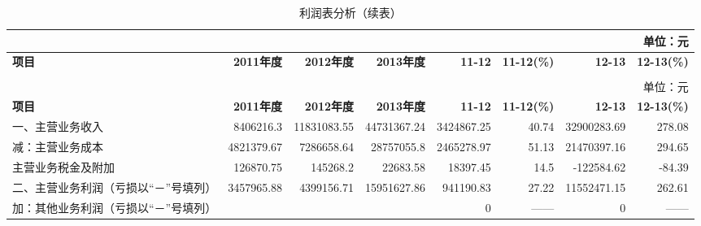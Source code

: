 \renewcommand*{\arraystretch}{0.8}
\setlength{\tabcolsep}{2pt}
\begin{longtable}{>{\scriptsize}l>{\scriptsize}r>{\scriptsize}r>{\scriptsize}r>{\scriptsize}r>{\scriptsize}r>{\scriptsize}r>{\scriptsize}r}
\caption[利润表分析]{利润表分析}\\  %
&&&&&&& {\scriptsize 单位：元}\\
\hline\hline
\rowcolor{mycyan}	\hspace{3em} \bfseries 项目 	& \bfseries 2011年度\hspace{1em} & \bfseries 2012年度\hspace{1em} 	& \bfseries 2013年度\hspace{1em} &  \bfseries  11-12    & \hspace{1em} \bfseries  11-12(\%) &  \bfseries  12-13     & \hspace{1em} \bfseries  12-13(\%)  \\ \endfirsthead          %
\caption[]{利润表分析（续表）} \\ 
&&&&&&& {\scriptsize 单位：元}\\                        %
\hline\hline
\rowcolor{mycyan}	\hspace{3em} \bfseries 项目 	& \bfseries 2011年度\hspace{1em} & \bfseries 2012年度\hspace{1em} 	& \bfseries 2013年度\hspace{1em} &  \bfseries  11-12    & \hspace{1em} \bfseries  11-12(\%) &  \bfseries  12-13     & \hspace{1em} \bfseries  12-13(\%)  \\  \endhead                %
\hline
\endfoot
\hline   %
	一、主营业务收入	&	8406216.3	&	11831083.55	&	44731367.24	&	3424867.25	&	40.74	&	32900283.69	&	278.08	\\
\hspace{2ex}	      减：主营业务成本	&	4821379.67	&	7286658.64	&	28757055.8	&	2465278.97	&	51.13	&	21470397.16	&	294.65	\\
\hspace{2ex}	          主营业务税金及附加	&	126870.75	&	145268.2	&	22683.58	&	18397.45	&	14.5	&	-122584.62	&	-84.39	\\
	二、主营业务利润（亏损以“－”号填列）	&	3457965.88	&	4399156.71	&	15951627.86	&	941190.83	&	27.22	&	11552471.15	&	262.61	\\
\hspace{2ex}	              加：其他业务利润（亏损以“－”号填列）	&		&		&		&	0	&	——	&	0	&	——	\\

\end{longtable}
